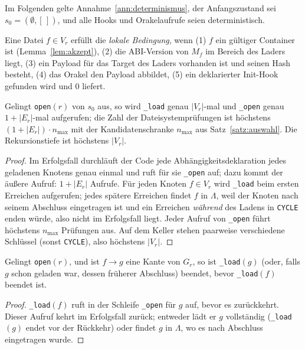 Im Folgenden gelte Annahme~\ref{ann:determinismus}, der Anfangszustand sei $s_0=(\emptyset,[\,])$, und alle Hooks und Orakelaufrufe seien deterministisch.

\begin{definition}
	\label{def:lokal}
	Eine Datei $f\in V_r$ erfüllt die \emph{lokale Bedingung}, wenn (1) $f$ ein gültiger Container ist (Lemma~\ref{lem:akzept}), (2) die ABI-Version von $M_f$ im Bereich des Laders liegt, (3) ein Payload für das Target des Laders vorhanden ist und seinen Hash besteht, (4) das Orakel den Payload abbildet, (5) ein deklarierter Init-Hook gefunden wird und $0$ liefert.
\end{definition}

\begin{satz}[Aufrufzahlen]
	\label{satz:kosten}
	Gelingt \texttt{open}$(r)$ von $s_0$ aus, so wird \texttt{\_load} genau $|V_r|$-mal und \texttt{\_open} genau $1+|E_r|$-mal aufgerufen; die Zahl der Dateisystemprüfungen ist höchstens $(1+|E_r|)\cdot n_{\max}$ mit der Kandidatenschranke $n_{\max}$ aus Satz~\ref{satz:auswahl}. Die Rekursionstiefe ist höchstens $|V_r|$.
\end{satz}

\begin{proof}
	Im Erfolgsfall durchläuft der Code jede Abhängigkeitsdeklaration jedes geladenen Knotens genau einmal und ruft für sie \texttt{\_open} auf; dazu kommt der äußere Aufruf: $1+|E_r|$ Aufrufe. Für jeden Knoten $f\in V_r$ wird \texttt{\_load} beim ersten Erreichen aufgerufen; jedes spätere Erreichen findet $f$ in $\Lambda$, weil der Knoten nach seinem Abschluss eingetragen ist und ein Erreichen \emph{während} des Ladens in \texttt{CYCLE} enden würde, also nicht im Erfolgsfall liegt. Jeder Aufruf von \texttt{\_open} führt höchstens $n_{\max}$ Prüfungen aus. Auf dem Keller stehen paarweise verschiedene Schlüssel (sonst \texttt{CYCLE}), also höchstens $|V_r|$.
\end{proof}

\begin{lemma}[Abschlussreihenfolge]
	\label{lem:abschluss}
	Gelingt \texttt{open}$(r)$, und ist $f\to g$ eine Kante von $G_r$, so ist \texttt{\_load}$(g)$ (oder, falls $g$ schon geladen war, dessen früherer Abschluss) beendet, bevor \texttt{\_load}$(f)$ beendet ist.
\end{lemma}

\begin{proof}
	\texttt{\_load}$(f)$ ruft in der Schleife \texttt{\_open} für $g$ auf, bevor es zurückkehrt. Dieser Aufruf kehrt im Erfolgsfall zurück; entweder lädt er $g$ vollständig (\texttt{\_load}$(g)$ endet vor der Rückkehr) oder findet $g$ in $\Lambda$, wo es nach Abschluss eingetragen wurde.
\end{proof}

